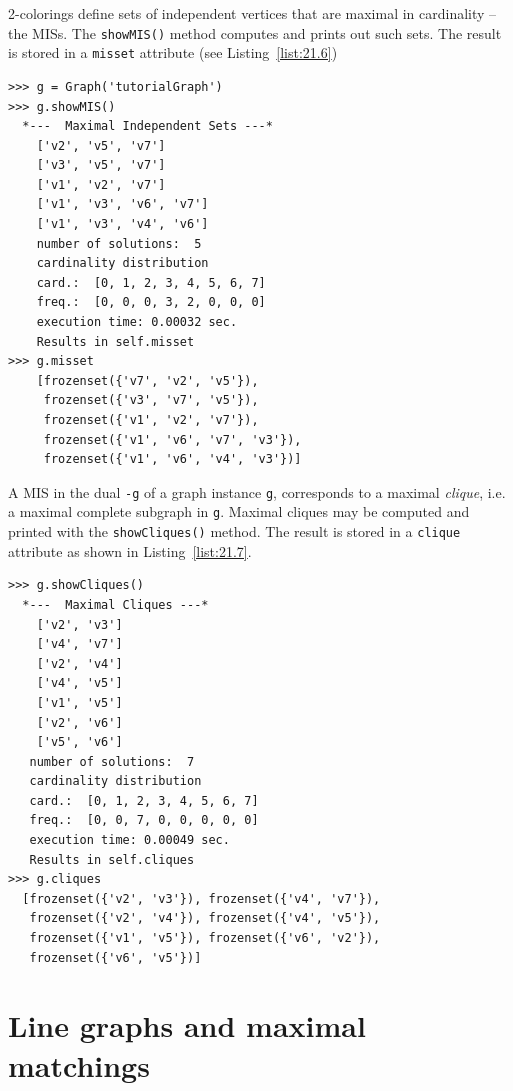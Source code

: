 2-colorings define sets of independent vertices that are maximal in cardinality --the MISs. The \texttt{showMIS()} method  computes and prints out such sets. The result is stored in a \texttt{misset} attribute (see Listing~\vref{list:21.6})
\begin{lstlisting}[caption={Computing and printing the maximal independent sets of graph \texttt{g}},label=list:21.6]
>>> g = Graph('tutorialGraph')
>>> g.showMIS()
  *---  Maximal Independent Sets ---*
    ['v2', 'v5', 'v7']
    ['v3', 'v5', 'v7']
    ['v1', 'v2', 'v7']
    ['v1', 'v3', 'v6', 'v7']
    ['v1', 'v3', 'v4', 'v6']
    number of solutions:  5
    cardinality distribution
    card.:  [0, 1, 2, 3, 4, 5, 6, 7]
    freq.:  [0, 0, 0, 3, 2, 0, 0, 0]
    execution time: 0.00032 sec.
    Results in self.misset
>>> g.misset
    [frozenset({'v7', 'v2', 'v5'}), 
     frozenset({'v3', 'v7', 'v5'}), 
     frozenset({'v1', 'v2', 'v7'}), 
     frozenset({'v1', 'v6', 'v7', 'v3'}), 
     frozenset({'v1', 'v6', 'v4', 'v3'})]
\end{lstlisting}

A MIS in the dual \texttt{-g} of a graph instance \texttt{g}, corresponds to a maximal \emph{clique}, i.e. a maximal complete subgraph in \texttt{g}. Maximal cliques may be computed and printed with the \texttt{showCliques()} method. The result is stored in a \texttt{clique} attribute as shown in Listing~\vref{list:21.7}.
\begin{lstlisting}[caption={Computing and printing the maximal independent sets of graph \texttt{g}},label=list:21.7]
>>> g.showCliques()
  *---  Maximal Cliques ---*
    ['v2', 'v3']
    ['v4', 'v7']
    ['v2', 'v4']
    ['v4', 'v5']
    ['v1', 'v5']
    ['v2', 'v6']
    ['v5', 'v6']
   number of solutions:  7
   cardinality distribution
   card.:  [0, 1, 2, 3, 4, 5, 6, 7]
   freq.:  [0, 0, 7, 0, 0, 0, 0, 0]
   execution time: 0.00049 sec.
   Results in self.cliques
>>> g.cliques
  [frozenset({'v2', 'v3'}), frozenset({'v4', 'v7'}), 
   frozenset({'v2', 'v4'}), frozenset({'v4', 'v5'}), 
   frozenset({'v1', 'v5'}), frozenset({'v6', 'v2'}), 
   frozenset({'v6', 'v5'})]
\end{lstlisting}

\section{Line graphs and maximal matchings}
\label{sec:21.4}

